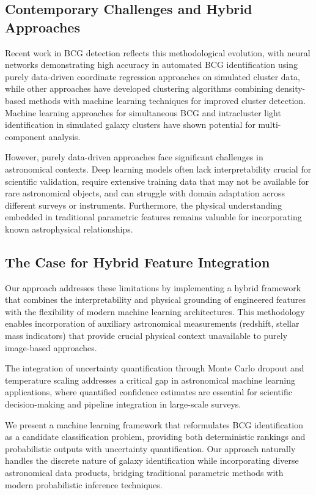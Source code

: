 \documentclass[twocolumn,10pt]{aastex631}
\begin{document}
\subsection{Contemporary Challenges and Hybrid Approaches}

Recent work in BCG detection reflects this methodological evolution, with neural networks demonstrating high accuracy in automated BCG identification using purely data-driven coordinate regression approaches on simulated cluster data, while other approaches have developed clustering algorithms combining density-based methods with machine learning techniques for improved cluster detection. Machine learning approaches for simultaneous BCG and intracluster light identification in simulated galaxy clusters have shown potential for multi-component analysis.

However, purely data-driven approaches face significant challenges in astronomical contexts. Deep learning models often lack interpretability crucial for scientific validation, require extensive training data that may not be available for rare astronomical objects, and can struggle with domain adaptation across different surveys or instruments. Furthermore, the physical understanding embedded in traditional parametric features remains valuable for incorporating known astrophysical relationships.

\subsection{The Case for Hybrid Feature Integration}

Our approach addresses these limitations by implementing a hybrid framework that combines the interpretability and physical grounding of engineered features with the flexibility of modern machine learning architectures. This methodology enables incorporation of auxiliary astronomical measurements (redshift, stellar mass indicators) that provide crucial physical context unavailable to purely image-based approaches.

The integration of uncertainty quantification through Monte Carlo dropout \citep{Laves2019WellCalibratedMU} and temperature scaling addresses a critical gap in astronomical machine learning applications, where quantified confidence estimates are essential for scientific decision-making and pipeline integration in large-scale surveys.

We present a machine learning framework that reformulates BCG identification as a candidate classification problem, providing both deterministic rankings and probabilistic outputs with uncertainty quantification. Our approach naturally handles the discrete nature of galaxy identification while incorporating diverse astronomical data products, bridging traditional parametric methods with modern probabilistic inference techniques.
\end{document}
